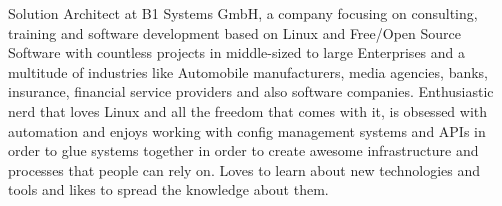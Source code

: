 

\begin{cvparagraph}

Solution Architect at B1 Systems GmbH, a company focusing on consulting, training and
software development based on Linux and Free/Open Source Software with countless projects in
middle-sized to large Enterprises and a multitude of industries like Automobile manufacturers, media
agencies, banks, insurance, financial service providers and also software companies. Enthusiastic
nerd that loves Linux and all the freedom that comes with it, is obsessed with automation and enjoys
working with config management systems and APIs in order to glue systems together in order to create awesome
infrastructure and processes that people can rely on. Loves to learn about new technologies and
tools and likes to spread the knowledge about them.
\end{cvparagraph}
